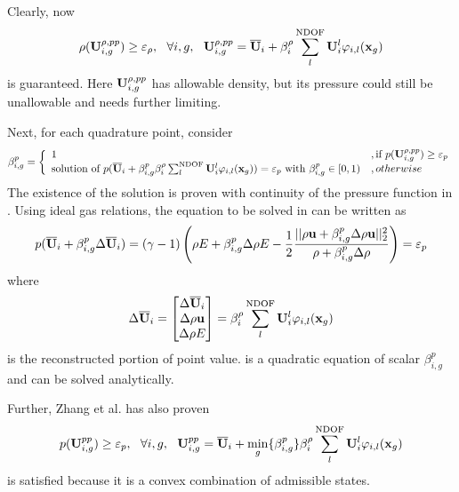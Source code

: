 Clearly, now 
\begin{equation}
    \rho(\U_{i,g}^{\rho,pp})\geq\varepsilon_\rho,\ \ 
     \forall i,g,\ \  
     \U_{i,g}^{\rho,pp} = \uu_{i} + \beta_{i}^\rho \sum_{l}^{\mathrm{NDOF}}{\U_i^l\varphi_{i,l}(\x_g)}
\end{equation}
is guaranteed. 
Here $\mathbf{U}_{i,g}^{\rho,pp}$ has allowable density, 
but its pressure could still be unallowable and needs further limiting.

Next, for each quadrature point, consider
\begin{equation}
    \label{eq:point-beta}
    \beta_{i,g}^p = \left\{
    \begin{array}{ll}
        1&,\text{if } p(\mathbf{U}_{i,g}^{\rho,pp}) \geq \varepsilon_p\\
        \text{solution of }
         p(\overline{\mathbf{U}}_{i} + \beta_{i,g}^p\beta_{i}^\rho \sum_{l}^{\mathrm{NDOF}}{\mathbf{U}_i^l\varphi_{i,l}(\mathbf{x}_g)}) = \varepsilon_p 
         \text{ with } \beta_{i,g}^p\in[0,1)&, otherwise 
    \end{array}
    \right.
\end{equation}
The existence of the solution is proven with continuity of the pressure function in \cite{zhang2010positivity}.
Using ideal gas relations, the equation to be solved in  can be written as 
\begin{equation}
    \label{eq:p-beta-function-sol}
    p(\overline{\mathbf{U}}_{i}+\beta_{i,g}^p\mathrm\Delta \overline{\mathbf{U}}_{i}) = (\gamma - 1) \left(
        \rho E + \beta_{i,g}^p\mathrm\Delta \rho E - \frac{1}{2} 
        \frac{||\rho \mathbf{u} + \beta_{i,g}^p\mathrm\Delta\rho\mathbf{u}||_2^2}
        {\rho + \beta_{i,g}^p\mathrm\Delta\rho}
    \right) = \varepsilon_p
\end{equation}
where 
$$
\mathrm\Delta \overline{\mathbf{U}}_{i} = \begin{bmatrix}
    \mathrm\Delta \overline{\mathbf{U}}_{i} \\ \mathrm\Delta\rho\mathbf{u} \\ \mathrm\Delta \rho E
\end{bmatrix} = \beta_{i}^\rho \sum_{l}^{\mathrm{NDOF}}{\mathbf{U}_i^l\varphi_{i,l}(\mathbf{x}_g)}
$$
is the reconstructed portion of point value.
 is a quadratic equation of scalar $\beta_{i,g}^p$ 
and can be solved analytically.

Further, Zhang et al. \cite{zhang2010positivity} has also proven 
\begin{equation}
    p(\U_{i,g}^{pp}) \geq \varepsilon_p,\ \ 
    \forall i,g,\ \ 
    \U_{i,g}^{pp} = \uu_{i} + \min_g\{\beta_{i,g}^p\}\beta_{i}^\rho \sum_{l}^{\mathrm{NDOF}}{\U_i^l\varphi_{i,l}(\x_g)}
\end{equation}
is satisfied because it is a convex combination of admissible states.

